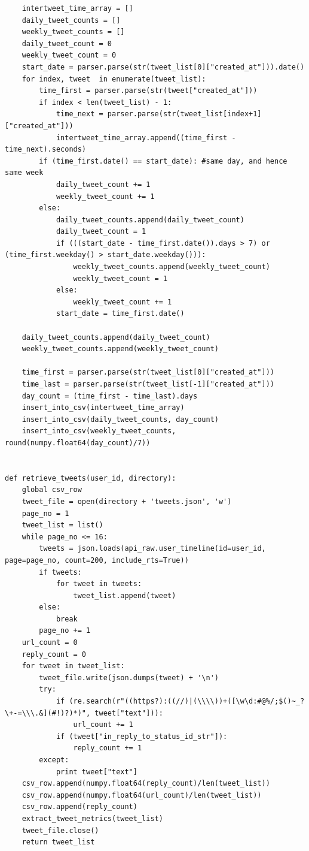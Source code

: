 \documentclass[11pt]{article}
\begin{document}
\begin{lstlisting}
    intertweet_time_array = []
    daily_tweet_counts = []
    weekly_tweet_counts = []
    daily_tweet_count = 0
    weekly_tweet_count = 0
    start_date = parser.parse(str(tweet_list[0]["created_at"])).date()
    for index, tweet  in enumerate(tweet_list):
        time_first = parser.parse(str(tweet["created_at"]))
        if index < len(tweet_list) - 1:
            time_next = parser.parse(str(tweet_list[index+1]["created_at"]))
            intertweet_time_array.append((time_first - time_next).seconds)
        if (time_first.date() == start_date): #same day, and hence same week
            daily_tweet_count += 1
            weekly_tweet_count += 1
        else:
            daily_tweet_counts.append(daily_tweet_count)
            daily_tweet_count = 1
            if (((start_date - time_first.date()).days > 7) or (time_first.weekday() > start_date.weekday())):
                weekly_tweet_counts.append(weekly_tweet_count)
                weekly_tweet_count = 1
            else:
                weekly_tweet_count += 1
            start_date = time_first.date()

    daily_tweet_counts.append(daily_tweet_count)
    weekly_tweet_counts.append(weekly_tweet_count)

    time_first = parser.parse(str(tweet_list[0]["created_at"]))
    time_last = parser.parse(str(tweet_list[-1]["created_at"]))
    day_count = (time_first - time_last).days
    insert_into_csv(intertweet_time_array)
    insert_into_csv(daily_tweet_counts, day_count)
    insert_into_csv(weekly_tweet_counts, round(numpy.float64(day_count)/7))


def retrieve_tweets(user_id, directory):
    global csv_row
    tweet_file = open(directory + 'tweets.json', 'w')
    page_no = 1
    tweet_list = list()
    while page_no <= 16:
        tweets = json.loads(api_raw.user_timeline(id=user_id, page=page_no, count=200, include_rts=True))
        if tweets:
            for tweet in tweets:
                tweet_list.append(tweet)
        else:
            break
        page_no += 1
    url_count = 0
    reply_count = 0
    for tweet in tweet_list:
        tweet_file.write(json.dumps(tweet) + '\n')
        try:
            if (re.search(r"((https?):((//)|(\\\\))+([\w\d:#@%/;$()~_?\+-=\\\.&](#!)?)*)", tweet["text"])):
                url_count += 1
            if (tweet["in_reply_to_status_id_str"]):
                reply_count += 1
        except:
            print tweet["text"]
    csv_row.append(numpy.float64(reply_count)/len(tweet_list))
    csv_row.append(numpy.float64(url_count)/len(tweet_list))
    csv_row.append(reply_count)
    extract_tweet_metrics(tweet_list)
    tweet_file.close()
    return tweet_list


\end{lstlisting}
\end{document}
